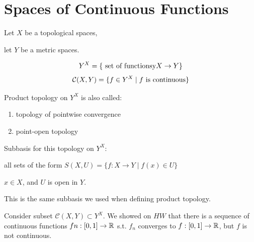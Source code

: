 \section{Spaces of Continuous Functions}
Let $X$ be a topological spaces,

let $Y$ be a metric spaces.

\[Y^X = \{\text{ set of functionsy} X \to Y\}\]
\[\mathcal{C}(X,Y) = \{ f \in Y^X \mid f \text{ is continuous}\}\]

Product topology on $Y^X$ is also called:
\begin{enumerate}[-]
    \item topology of pointwise convergence
    \item point-open topology
\end{enumerate}

Subbasis for this topology on $Y^X$:

all sets of the form $S(X,U)=\{f : X \to Y \mid f(x) \in U\}$

$x \in X$, and $U$ is open in $Y$.

This is the same subbasis we used when defining product topology.


Consider subset $\mathcal{C}(X,Y) \subset Y^X$. We showed on $HW$ that there is a sequence of continuous functions $fn : [0,1] \to \mathbb{R}$ s.t. $f_n$ converges to $f:[0,1] \to \mathbb{R}$, but $f$ is not continuous.

